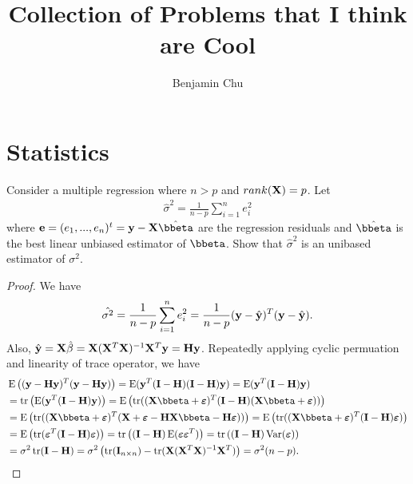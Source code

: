 \documentclass[some_latex_template.tex]{subfiles}
\begin{document}
\title{Collection of Problems that I think are Cool}
\author{Benjamin Chu}
\maketitle

\section{Statistics}

\begin{problembox}{}{}
Consider a multiple regression where $n > p$ and $rank(\mathbf{X}) = p$. Let
\begin{align*}
	\hat{\sigma}^2 = \frac{1}{n-p}\sum_{i=1}^{n}e_i^2
\end{align*}
where $\be = (e_1,...,e_n)^t = \by - \bX\hat{\bbeta}$ are the regression residuals and $\hat{\bbeta}$ is the best linear unbiased estimator of $\bbeta$. Show that $\hat{\sigma}^2$ is an unibased estimator of $\sigma^2.$
\end{problembox}

\begin{proof}
We have
\begin{align*}
	\hat{\sigma^2} = \frac{1}{n-p}\sum_{i=1}^{n}e_i^2 = \frac{1}{n-p} (\mathbf{y} - \hat{\mathbf{y}})^T(\mathbf{y} - \hat{\mathbf{y}}).
\end{align*}
Also, $\hat{\mathbf{y}} = \mathbf{X}\hat{\beta} = \mathbf{X}(\mathbf{X}^T\mathbf{X})^{-1}\mathbf{X}^T\mathbf{y} = \mathbf{H}\mathbf{y}$. Repeatedly applying cyclic permuation and linearity of trace operator, we have
\begin{align*}
 &\E\left( (\by - \bH\by)^T(\by - \bH\by) \right) = \E(\by^T(\bI - \bH)(\bI - \bH)\by) = \E(\by^T(\bI-\bH)\by) \\
 &= \tr \left( \E(\by^T(\bI-\bH)\by)\right) = \E \left( \tr((\bX\bbeta + \bepsilon)^T(\bI-\bH)(\bX\bbeta + \bepsilon))\right) \\
&= \E \left( \tr((\bX\bbeta + \bepsilon)^T(\bX + \bepsilon - \bH\bX\bbeta - \bH \bepsilon))\right) = \E \left( \tr((\bX\bbeta + \bepsilon)^T(\bI-\bH) \bepsilon)\right) \\
&= \E \left( \tr( \bepsilon^T(\bI-\bH)\bepsilon)\right) = \tr\left( (\bI - \bH)\E(\bepsilon\bepsilon^T)\right) = \tr\left((\bI-\bH)\Var(\bepsilon)\right)\\
&= \sigma^2\tr(\bI - \bH) = \sigma^2\left(\tr(\bI_{n \times n}) - \tr(\bX(\bX^T\bX)^{-1}\bX^T)\right) = \sigma^2 (n - p).
\end{align*}
\end{proof}
\end{document}
